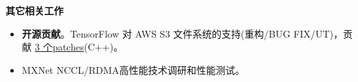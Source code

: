 \documentclass{resume}
\begin{document}

\begin{onehalfspacing}
\textbf{其它相关工作}  
\begin{itemize}%
  \item \textbf{开源贡献}。TensorFlow 对 AWS S3 文件系统的支持(重构/BUG FIX/UT)，贡献 \href{https://github.com/tensorflow/tensorflow/pull/11089#issuecomment-320258536}{3 个patches}(C++)。
  \item MXNet NCCL/RDMA高性能技术调研和性能测试。
\end{itemize}
\end{onehalfspacing}
\end{document}
